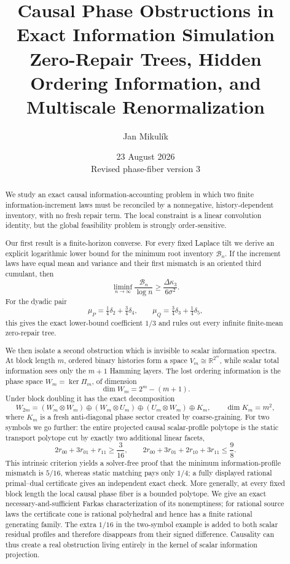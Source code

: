 \documentclass[11pt,a4paper]{article}
\title{\textbf{Causal Phase Obstructions in Exact Information Simulation}\\[0.35em]
\large Zero-Repair Trees, Hidden Ordering Information, and Multiscale Renormalization}
\author{Jan Mikul\'ik}
\date{23 August 2026\\[0.2em]\small Revised phase-fiber version 3}
\theoremstyle{definition}
\theoremstyle{remark}
\newcommand{\R}{\mathbb R}
\newcommand{\cB}{\mathcal B}
\begin{document}
\maketitle

\begin{abstract}
We study an exact causal information-accounting problem in which two finite
information-increment laws must be reconciled by a nonnegative,
history-dependent inventory, with no fresh repair term.  The local constraint is
a linear convolution identity, but the global feasibility problem is strongly
order-sensitive.

Our first result is a finite-horizon converse.  For every fixed Laplace tilt we
derive an explicit logarithmic lower bound for the minimum root inventory
\(\cB_n\).  If the increment laws have equal mean and variance and their first
mismatch is an oriented third cumulant, then
\[
 \liminf_{n\to\infty}\frac{\cB_n}{\log n}
 \ge \frac{\Delta\kappa_3}{6\sigma^2}.
\]
For the dyadic pair
\[
 \mu_P=\tfrac14\delta_2+\tfrac34\delta_4,
 \qquad
 \mu_Q=\tfrac34\delta_3+\tfrac14\delta_5,
\]
this gives the exact lower-bound coefficient \(1/3\) and rules out every infinite
finite-mean zero-repair tree.

We then isolate a second obstruction which is invisible to scalar information
spectra.  At block length \(m\), ordered binary histories form a space
\(V_m\cong\R^{2^m}\), while scalar total information sees only the \(m+1\)
Hamming layers.  The lost ordering information is the phase space
\(W_m=\ker\Pi_m\), of dimension
\[
 \dim W_m=2^m-(m+1).
\]
Under block doubling it has the exact decomposition
\[
W_{2m}=(W_m\otimes W_m)\oplus(W_m\otimes U_m)
\oplus(U_m\otimes W_m)\oplus K_m,
\qquad \dim K_m=m^2,
\]
where \(K_m\) is a fresh anti-diagonal phase sector created by coarse-graining.
For two symbols we go further: the entire projected causal scalar-profile
polytope is the static transport polytope cut by exactly two additional linear
facets,
\[
2r_{00}+3r_{01}+r_{11}\ge\frac3{16},\qquad
2r_{00}+3r_{01}+2r_{10}+3r_{11}\le\frac98.
\]
This intrinsic criterion yields a solver-free proof that the minimum
information-profile mismatch is \(5/16\), whereas static matching pays only
\(1/4\); a fully displayed rational primal--dual certificate gives an
independent exact check.  More generally, at every fixed block length the
local causal phase fiber is a bounded polytope.  We give an exact
necessary-and-sufficient Farkas characterization of its nonemptiness; for
rational source laws the certificate cone is rational polyhedral and hence has
a finite rational generating family.  The extra \(1/16\) in the two-symbol
example is added to both scalar residual profiles and therefore disappears from
their signed difference.  Causality can thus create a real obstruction living
entirely in the kernel of scalar information projection.


\end{abstract}
\end{document}
